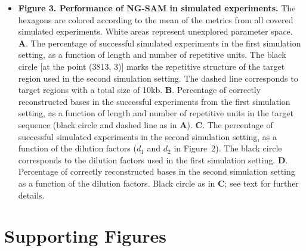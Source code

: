 \documentclass[10pt]{article}
\newcommand{\blue}[1]{{\color{blue} #1}}
\begin{document}
\begin{itemize}
\item {\bf Figure 3. Performance of NG-SAM in simulated experiments.}
The hexagons are colored according to the mean of the metrics from all covered simulated experiments. White areas represent unexplored parameter space. {\bf A}. The percentage of successful simulated experiments in the first simulation setting, as a function of length and number of repetitive units. The black circle [at the point (3813, 3)] marks the repetitive structure of the target region used in the second simulation setting. The dashed line corresponds to target regions with a \blue{total} size of 10kb. {\bf B}. Percentage of correctly reconstructed bases in the successful experiments from the first simulation setting, as a function of length and number of repetitive units in the target sequence (black circle and dashed line as in {\bf A}). {\bf C}. The percentage of successful simulated experiments in the second simulation setting, as a function of the dilution factors ($d_1$ and $d_2$ in Figure~2). The black circle corresponds to the dilution factors used in the first simulation setting. {\bf D}.  Percentage of correctly reconstructed bases in the second simulation setting as a function of the dilution factors. \blue{Black circle as in {\bf C}; see text for further details}.

\end{itemize}

\section*{Supporting Figures}
\end{document}
